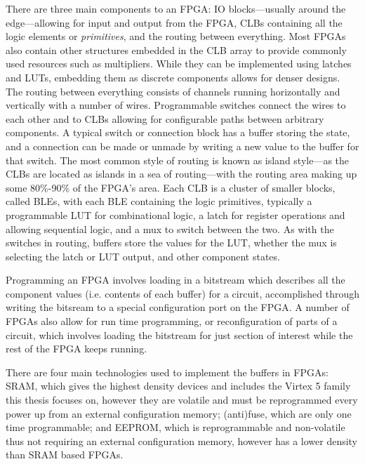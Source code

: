 \documentclass[12pt,drafta4paper,oneside]{memoir} %
\begin{document}
There are three main components to an \ac{FPGA}: \ac{IO} blocks---usually around the edge---allowing for input and output from the \ac{FPGA}, \acp{CLB} containing all the logic elements or \emph{primitives}, and the routing between everything.
Most \acp{FPGA} also contain other structures embedded in the \ac{CLB} array to provide commonly used resources such as multipliers. While they can be implemented using latches and \acp{LUT}, embedding them as discrete components allows for denser designs.
The routing between everything consists of channels running horizontally and vertically with a number of wires. Programmable switches connect the wires to each other and to \acp{CLB} allowing for configurable paths between arbitrary components. A typical switch or connection block has a buffer storing the state, and a connection can be made or unmade by writing a new value to the buffer for that switch. The most common style of routing is known as island style---as the \acp{CLB} are located as islands in a sea of routing---with the routing area making up some 80\%-90\% of the \ac{FPGA}'s area\cite{FPGAArch}.
Each \ac{CLB} is a cluster of smaller blocks, called \acp{BLE}, with each \ac{BLE} containing the logic primitives, typically a programmable \ac{LUT} for combinational logic, a latch for register operations and allowing sequential logic, and a \ac{mux} to switch between the two. As with the switches in routing, buffers store the values for the \ac{LUT}, whether the \ac{mux} is selecting the latch or \ac{LUT} output, and other component states.

Programming an \ac{FPGA} involves loading in a bitstream which describes all the component values (i.e. contents of each buffer) for a circuit, accomplished through writing the bitsream to a special configuration port on the \ac{FPGA}. A number of \acp{FPGA} also allow for run time programming, or reconfiguration of parts of a circuit, which involves loading the bitstream for just section of interest while the rest of the \ac{FPGA} keeps running.

There are four main technologies used to implement the buffers in \acp{FPGA}: \ac{SRAM}, which gives the highest density devices and includes the Virtex 5 family this thesis focuses on, however they are volatile and must be reprogrammed every power up from an external configuration memory; (anti)fuse, which are only one time programmable; and \ac{EEPROM}, which is reprogrammable and non-volatile thus not requiring an external configuration memory, however has a lower density than \ac{SRAM} based \acp{FPGA}\cite{FPGAArch}.
\end{document}
